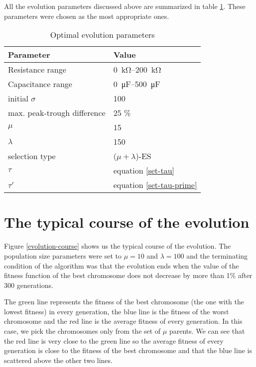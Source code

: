 All the evolution parameters discussed above are summarized in table \ref{evolution-parameters}. These parameters were chosen as the most appropriate ones.

\begin{table}[H]
\centering
\begin{tabular}{@{}ll@{}}
\toprule
    Parameter                   & Value \\ \midrule
    Resistance range            & \SIrange{0}{200}{\kilo\ohm} \\
    Capacitance range           & \SIrange{0}{500}{\micro\farad} \\
    initial $\sigma$            & 100 \\
    max. peak-trough difference & 25 \% \\
    $\mu$                       & 15 \\
    $\lambda$                   & 150 \\
    selection type              & ($\mu + \lambda$)-ES \\
    $\tau$                      & equation \ref{set-tau}\\
    $\tau'$                     & equation \ref{set-tau-prime} \\ \bottomrule
\end{tabular}
\caption{Optimal evolution parameters}
\label{evolution-parameters}
\end{table}

\section{The typical course of the evolution}
Figure \ref{evolution-course} shows us the typical course of the evolution. The population size parameters were set to $\mu = 10$ and $\lambda = 100$ and the terminating condition of the algorithm was that the evolution ends when the value of the fitness function of the best chromosome does not decrease by more than 1\% after 300 generations.

The green line represents the fitness of the best chromosome (the one with the lowest fitness) in every generation, the blue line is the fitness of the worst chromosome and the red line is the average fitness of every generation. In this case, we pick the chromosomes only from the set of $\mu$ parents. We can see that the red line is very close to the green line so the average fitness of every generation is close to the fitness of the best chromosome and that the blue line is scattered above the other two lines.

